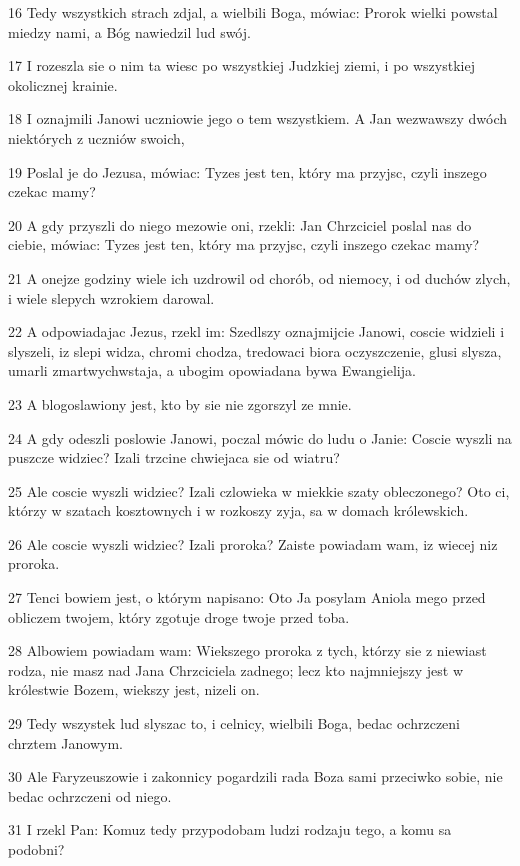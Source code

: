 \par 16 Tedy wszystkich strach zdjal, a wielbili Boga, mówiac: Prorok wielki powstal miedzy nami, a Bóg nawiedzil lud swój.
\par 17 I rozeszla sie o nim ta wiesc po wszystkiej Judzkiej ziemi, i po wszystkiej okolicznej krainie.
\par 18 I oznajmili Janowi uczniowie jego o tem wszystkiem. A Jan wezwawszy dwóch niektórych z uczniów swoich,
\par 19 Poslal je do Jezusa, mówiac: Tyzes jest ten, który ma przyjsc, czyli inszego czekac mamy?
\par 20 A gdy przyszli do niego mezowie oni, rzekli: Jan Chrzciciel poslal nas do ciebie, mówiac: Tyzes jest ten, który ma przyjsc, czyli inszego czekac mamy?
\par 21 A onejze godziny wiele ich uzdrowil od chorób, od niemocy, i od duchów zlych, i wiele slepych wzrokiem darowal.
\par 22 A odpowiadajac Jezus, rzekl im: Szedlszy oznajmijcie Janowi, coscie widzieli i slyszeli, iz slepi widza, chromi chodza, tredowaci biora oczyszczenie, glusi slysza, umarli zmartwychwstaja, a ubogim opowiadana bywa Ewangielija.
\par 23 A blogoslawiony jest, kto by sie nie zgorszyl ze mnie.
\par 24 A gdy odeszli poslowie Janowi, poczal mówic do ludu o Janie: Coscie wyszli na puszcze widziec? Izali trzcine chwiejaca sie od wiatru?
\par 25 Ale coscie wyszli widziec? Izali czlowieka w miekkie szaty obleczonego? Oto ci, którzy w szatach kosztownych i w rozkoszy zyja, sa w domach królewskich.
\par 26 Ale coscie wyszli widziec? Izali proroka? Zaiste powiadam wam, iz wiecej niz proroka.
\par 27 Tenci bowiem jest, o którym napisano: Oto Ja posylam Aniola mego przed obliczem twojem, który zgotuje droge twoje przed toba.
\par 28 Albowiem powiadam wam: Wiekszego proroka z tych, którzy sie z niewiast rodza, nie masz nad Jana Chrzciciela zadnego; lecz kto najmniejszy jest w królestwie Bozem, wiekszy jest, nizeli on.
\par 29 Tedy wszystek lud slyszac to, i celnicy, wielbili Boga, bedac ochrzczeni chrztem Janowym.
\par 30 Ale Faryzeuszowie i zakonnicy pogardzili rada Boza sami przeciwko sobie, nie bedac ochrzczeni od niego.
\par 31 I rzekl Pan: Komuz tedy przypodobam ludzi rodzaju tego, a komu sa podobni?
